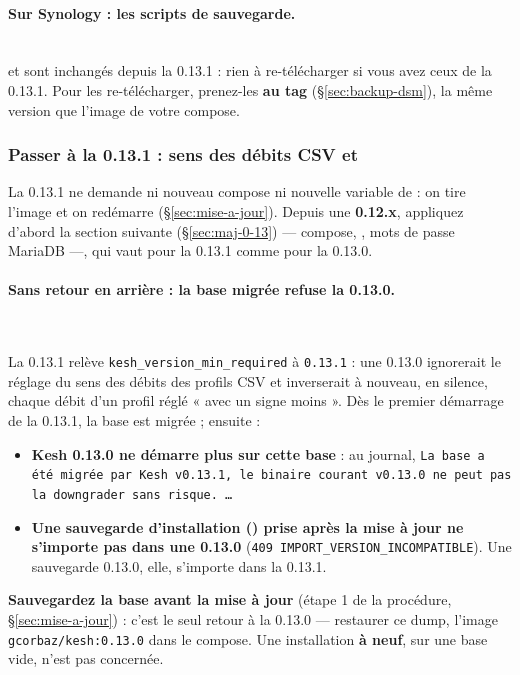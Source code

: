 \documentclass[a4paper,11pt,oneside]{article}
\begin{document}
\paragraph{Sur Synology : les scripts de sauvegarde.}\mbox{}\\
 et  sont inchangés depuis la 0.13.1 : rien à re-télécharger si vous avez ceux de la 0.13.1. Pour les re-télécharger, prenez-les \textbf{au tag } (\S\ref{sec:backup-dsm}), la même version que l'image de votre compose.

\subsubsection{Passer à la 0.13.1 : sens des débits CSV et }\label{sec:maj-0-13-1}

La 0.13.1 ne demande ni nouveau compose ni nouvelle variable de  : on tire l'image et on redémarre (\S\ref{sec:mise-a-jour}). Depuis une \textbf{0.12.x}, appliquez d'abord la section suivante (\S\ref{sec:maj-0-13}) --- compose, , mots de passe MariaDB ---, qui vaut pour la 0.13.1 comme pour la 0.13.0.

\paragraph{Sans retour en arrière : la base migrée refuse la 0.13.0.}\label{sec:maj-0-13-1-sans-retour}\mbox{}\\
\begin{sloppypar}
La 0.13.1 relève \texttt{kesh\_version\_min\_required} à \texttt{0.13.1} : une 0.13.0 ignorerait le réglage du sens des débits des profils CSV et inverserait à nouveau, en silence, chaque débit d'un profil réglé « avec un signe moins ». Dès le premier démarrage de la 0.13.1, la base est migrée ; ensuite :
\end{sloppypar}
\begin{itemize}
    \item \textbf{Kesh 0.13.0 ne démarre plus sur cette base} : au journal, \texttt{La base a été migrée par Kesh v0.13.1, le binaire courant v0.13.0 ne peut pas la downgrader sans risque. \ldots}
    \item \textbf{Une sauvegarde d'installation () prise après la mise à jour ne s'importe pas dans une 0.13.0} (\texttt{409 IMPORT\_VERSION\_INCOMPATIBLE}). Une sauvegarde 0.13.0, elle, s'importe dans la 0.13.1.
\end{itemize}
\begin{keshwarning}
\textbf{Sauvegardez la base avant la mise à jour} (étape 1 de la procédure, \S\ref{sec:mise-a-jour}) : c'est le seul retour à la 0.13.0 --- restaurer ce dump, l'image \texttt{gcorbaz/kesh:0.13.0} dans le compose. Une installation \textbf{à neuf}, sur une base vide, n'est pas concernée.
\end{keshwarning}
\end{document}
